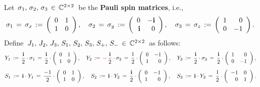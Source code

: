 \vskip 0.5cm
\begin{proposition}
\mbox{}
\vskip 0.1cm
\noindent
Let \,$\sigma_{1},\, \sigma_{2},\, \sigma_{3} \,\in\, \mathbb{C}^{2 \times 2}$\, be the \textbf{Pauli spin matrices}, i.e.,
\begin{equation*}
\sigma_{1} \,=\, \sigma_{x} \,:=\, \left(\begin{array}{cc} 0 & 1 \\ 1 & 0 \end{array}\right),
\quad
\sigma_{2} \,=\, \sigma_{y} \,:=\, \left(\begin{array}{rr} 0 & -\textnormal{\bf i} \\ \textnormal{\bf i} & 0 \end{array}\right),
\quad
\sigma_{3} \,=\, \sigma_{z} \,:=\, \left(\begin{array}{rr} 1 & 0 \\ 0 & -1 \end{array}\right).
\end{equation*}
Define \,$J_{1},\, J_{2},\, J_{3},\, S_{1},\, S_{2},\, S_{3},\, S_{+},\, S_{-} \,\in\, \mathbb{C}^{2 \times 2}$\, as follows:
\begin{equation*}
Y_{1} \,:=\, \dfrac{\textnormal{\bf i}}{2}\cdot\sigma_{1} \,=\, \dfrac{\textnormal{\bf i}}{2}\cdot\left(\begin{array}{cc} 0 & 1 \\ 1 & 0 \end{array}\right),
\quad
Y_{2} \,:=\, \mathbf{{\color{red}-}}\,\dfrac{\textnormal{\bf i}}{2}\cdot\sigma_{2} \,=\, \dfrac{1}{2}\cdot\left(\begin{array}{rr} 0 & -1 \\ 1 & 0 \end{array}\right),
\quad
Y_{3} \,:=\, \dfrac{\textnormal{\bf i}}{2}\cdot\sigma_{3} \,=\, \dfrac{\textnormal{\bf i}}{2}\cdot\left(\begin{array}{rr} 1 & 0 \\ 0 & -1 \end{array}\right),
\end{equation*}
\begin{equation*}
S_{1} \,:=\, \i \cdot Y_{1} \,=\, \dfrac{-1}{2} \cdot \left(\begin{array}{rr} 0 & 1 \\ 1 & 0 \end{array}\right),
\quad
S_{2} \,:=\, \i \cdot Y_{2} \,=\, \dfrac{\i}{2} \cdot \left(\begin{array}{rr} 0 & -1 \\ 1 & 0 \end{array}\right),
\quad
S_{3} \,:=\, \i \cdot Y_{3} \,=\, \dfrac{1}{2}\cdot\left(\begin{array}{rr} -1 & 0 \\ 0 & 1 \end{array}\right).

\end{equation*}
\end{proposition}
